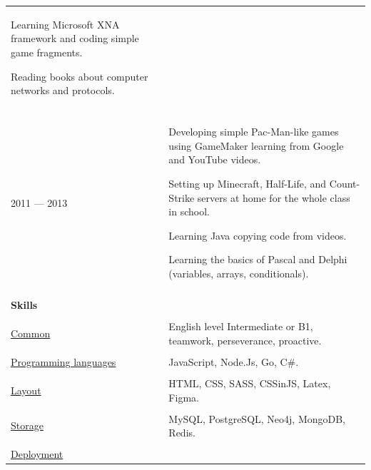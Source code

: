 \documentclass[12pt]{article}
\begin{document}
\begin{tabularx}{500pt}{eX}
        Learning Microsoft XNA framework and coding simple game fragments.

        Reading books about computer networks and protocols.

        \\

        &\\

        2011 --- 2013 & Developing simple Pac-Man-like games using GameMaker learning from Google and YouTube videos.

        Setting up Minecraft, Half-Life, and Count-Strike servers at home for the whole class in school.

        Learning Java copying code from videos.

        Learning the basics of Pascal and Delphi (variables, arrays, conditionals).

        \\

        &\\

        \textbf{Skills}& \\

        &\\

        \underline{Common} &

        English level Intermediate or B1, teamwork, perseverance, proactive. \\

        &\\

        \underline{Programming languages} &

        JavaScript, Node.Js, Go, C\#. \\

        & \\

        \underline{Layout} &

        HTML, CSS, SASS, CSSinJS, Latex, Figma. \\

        & \\

        \underline{Storage} &

        MySQL, PostgreSQL, Neo4j, MongoDB, Redis. \\

        &\\

        \underline{Deployment} &


\end{tabularx}
\end{document}

